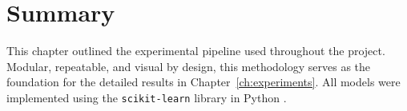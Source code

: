 \section{Summary}

This chapter outlined the experimental pipeline used throughout the project. Modular, repeatable, and visual by design, this methodology serves as the foundation for the detailed results in Chapter~\ref{ch:experiments}. All models were implemented using the \texttt{scikit-learn} library in Python \cite{sklearn}.
